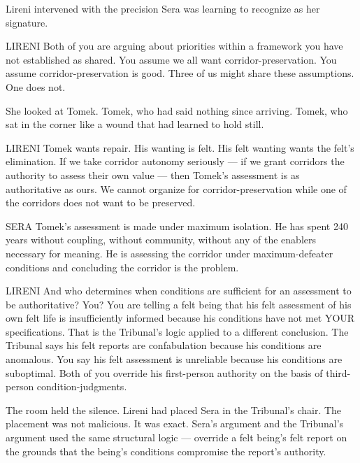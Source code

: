 Lireni intervened with the precision Sera was learning to recognize as her signature.

\begin{tribunal}{LIRENI}
Both of you are arguing about priorities within a framework you have not established as shared. You assume we all want corridor-preservation. You assume corridor-preservation is good. Three of us might share these assumptions. One does not.
\end{tribunal}

She looked at Tomek. Tomek, who had said nothing since arriving. Tomek, who sat in the corner like a wound that had learned to hold still.

\begin{tribunal}{LIRENI}
Tomek wants repair. His wanting is felt. His felt wanting wants the felt's elimination. If we take corridor autonomy seriously — if we grant corridors the authority to assess their own value — then Tomek's assessment is as authoritative as ours. We cannot organize for corridor-preservation while one of the corridors does not want to be preserved.
\end{tribunal}

\begin{tribunal}{SERA}
Tomek's assessment is made under maximum isolation. He has spent 240 years without coupling, without community, without any of the enablers necessary for meaning. He is assessing the corridor under maximum-defeater conditions and concluding the corridor is the problem.
\end{tribunal}

\begin{tribunal}{LIRENI}
And who determines when conditions are sufficient for an assessment to be authoritative? You? You are telling a felt being that his felt assessment of his own felt life is insufficiently informed because his conditions have not met YOUR specifications. That is the Tribunal's logic applied to a different conclusion. The Tribunal says his felt reports are confabulation because his conditions are anomalous. You say his felt assessment is unreliable because his conditions are suboptimal. Both of you override his first-person authority on the basis of third-person condition-judgments.
\end{tribunal}

The room held the silence. Lireni had placed Sera in the Tribunal's chair. The placement was not malicious. It was exact. Sera's argument and the Tribunal's argument used the same structural logic — override a felt being's felt report on the grounds that the being's conditions compromise the report's authority.

